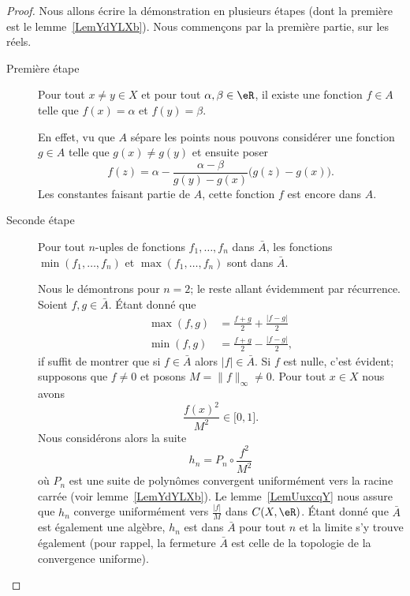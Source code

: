 \begin{proof}
	Nous allons écrire la démonstration en plusieurs étapes (dont la première est le lemme~\ref{LemYdYLXb}). Nous commençons par la première partie, sur les réels.

	\begin{description}
		\item[Première étape] Pour tout \( x\neq y\in X\) et pour tout \( \alpha,\beta\in \eR\), il existe une fonction \( f\in A\) telle que \( f(x)=\alpha\) et \( f(y)=\beta\).

			En effet, vu que \( A\) sépare les points nous pouvons considérer une fonction \( g\in A\) telle que \( g(x)\neq g(y)\) et ensuite poser
			\begin{equation}
				f(z)=\alpha-\frac{ \alpha-\beta }{ g(y)-g(x) }\big( g(z)-g(x) \big).
			\end{equation}
			Les constantes faisant partie de \( A\), cette fonction \( f\) est encore dans \( A\).

		\item[Seconde étape] Pour tout \( n\)-uples de fonctions \( f_1,\ldots, f_n\) dans \( \bar A\), les fonctions \( \min(f_1,\ldots, f_n)\) et \( \max(f_1,\ldots, f_n)\) sont dans \( \bar A\).

			Nous le démontrons pour \( n=2\); le reste allant évidemment par récurrence. Soient \( f,g\in \bar A\). Étant donné que
			\begin{subequations}
				\begin{align}
					\max(f,g) & =\frac{ f+g }{2}+\frac{ | f-g | }{2}  \\
					\min(f,g) & =\frac{ f+g }{2}-\frac{ | f-g | }{2},
				\end{align}
			\end{subequations}
			if suffit de montrer que si \( f\in\bar A\) alors \( | f |\in \bar A\). Si \( f\) est nulle, c'est évident; supposons que \( f\neq 0\) et posons \( M=\| f \|_{\infty}\neq 0\). Pour tout \( x\in X\) nous avons
			\begin{equation}
				\frac{ f(x)^2 }{ M^2 }\in \mathopen[ 0 , 1 \mathclose].
			\end{equation}
			Nous considérons alors la suite
			\begin{equation}
				h_n=P_n\circ\frac{ f^2 }{ M^2 }
			\end{equation}
			où \( P_n\) est une suite de polynômes convergent uniformément vers la racine carrée (voir lemme~\ref{LemYdYLXb}). Le lemme~\ref{LemUuxcqY} nous assure que \( h_n\) converge uniformément vers \( \frac{ | f | }{ M }\) dans \( C(X,\eR)\). Étant donné que \( \bar A\) est également une algèbre, \( h_n\) est dans \( \bar A\) pour tout \( n\) et la limite s'y trouve également (pour rappel, la fermeture \( \bar A\) est celle de la topologie de la convergence uniforme).


\end{description}
\end{proof}
